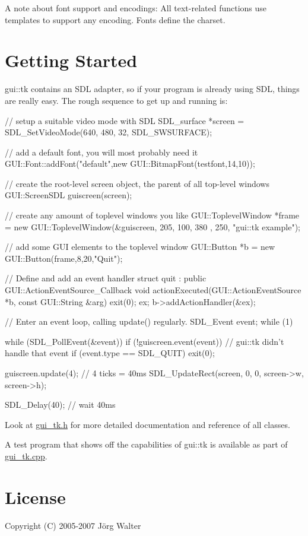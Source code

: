 A note about font support and encodings\-: All text-\/related functions use templates to support any encoding. Fonts define the charset.\hypertarget{gui_1_1tk_g}{}\section{Getting Started}\label{gui_1_1tk_g}
gui\-::tk contains an S\-D\-L adapter, so if your program is already using S\-D\-L, things are really easy. The rough sequence to get up and running is\-:


\begin{DoxyCode}
 // setup a suitable video mode with SDL
 SDL_surface *screen = SDL_SetVideoMode(640, 480, 32, SDL_SWSURFACE);

 // add a default font, you will most probably need it
 GUI::Font::addFont("default",new GUI::BitmapFont(testfont,14,10));

 // create the root-level screen object, the parent of all top-level windows
 GUI::ScreenSDL guiscreen(screen);

 // create any amount of toplevel windows you like
 GUI::ToplevelWindow *frame = new GUI::ToplevelWindow(&guiscreen, 205, 100, 380
      , 250, "gui::tk example");

 // add some GUI elements to the toplevel window
 GUI::Button *b = new GUI::Button(frame,8,20,"Quit");

 // Define and add an event handler
 struct quit : public GUI::ActionEventSource_Callback {
     void actionExecuted(GUI::ActionEventSource *b, const GUI::String &arg) {
         exit(0);
     }
 } ex;
 b->addActionHandler(&ex);

 // Enter an event loop, calling update() regularly.
 SDL_Event event;
 while (1) {
     while (SDL_PollEvent(&event)) {
         if (!guiscreen.event(event)) { // gui::tk didn't handle that event
             if (event.type == SDL_QUIT) exit(0);
         }
     }

     guiscreen.update(4); // 4 ticks = 40ms
     SDL_UpdateRect(screen, 0, 0, screen->w, screen->h);

     SDL_Delay(40); // wait 40ms
 }
\end{DoxyCode}


Look at \hyperlink{gui__tk_8h}{gui\-\_\-tk.\-h} for more detailed documentation and reference of all classes.

A test program that shows off the capabilities of gui\-::tk is available as part of \hyperlink{gui__tk_8cpp}{gui\-\_\-tk.\-cpp}.\hypertarget{gui_1_1tk_l}{}\section{License}\label{gui_1_1tk_l}
Copyright (C) 2005-\/2007 Jörg Walter

